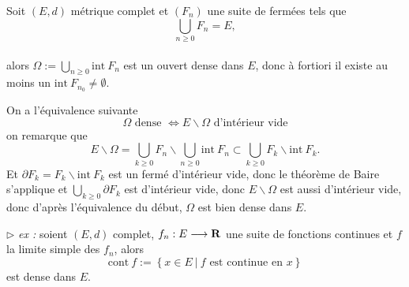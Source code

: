 \documentclass[a4paper,11pt, twoside]{article}
\begin{document}
\begin{corollaire}
  Soit $(E,d)$ métrique complet et $\left(F_n\right)$ une suite de fermées tels que 
  $$\bigcup_{n\geqslant 0}F_n=E,$$\\

  alors $\Omega:=\bigcup_{n\geqslant 0}\mathrm{int}\ F_n$ est un ouvert dense dans $E$, donc à fortiori il existe au moins un $\mathrm{int}\ {F_{n_0}}\neq\emptyset$.
\end{corollaire}

\begin{Proof}
  On a l'équivalence suivante 
  $$\Omega\text{ dense }\Leftrightarrow E\backslash \Omega\text{ d'intérieur vide}$$
  on remarque que 
  $$E\backslash\Omega=\bigcup_{k\geqslant 0}F_n\backslash\bigcup_{n\geqslant 0}\mathrm{int}\ F_n\subset \bigcup_{k\geqslant 0}F_k\backslash\mathrm{int}\ F_k.$$
  Et $\partial F_k=F_k\backslash\mathrm{int}\ F_k$ est un fermé d'intérieur vide, donc le théorème de Baire s'applique et $\bigcup_{k\geqslant 0}\partial F_k$ est d'intérieur vide, donc $E\backslash\Omega$ est aussi d'intérieur vide, donc d'après l'équivalence du début, $\Omega$ est bien dense dans $E$.
\end{Proof}

$\triangleright$\emph{ ex :} soient $(E,d)$ complet, $f_n:E\longrightarrow \mathbf R$ une suite de fonctions continues et $f$ la limite simple des $f_n$, alors 
$$\mathrm{cont}\ f:=\left\{x\in E\ |\ f\text{ est continue en }x\right\}$$
est dense dans $E$.
\end{document}
